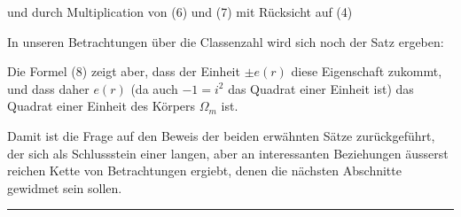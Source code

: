 und durch Multiplication von (6) und (7) mit Rücksicht auf (4)


In unseren Betrachtungen über die Classenzahl wird sich noch der Satz ergeben:


Die Formel (8) zeigt aber, dass der Einheit $\pm e(r)$ diese Eigenschaft zukommt, und dass daher $e(r)$ (da auch $-1 = i^2$ das Quadrat einer Einheit ist) das Quadrat einer Einheit des Körpers $\Omega_m$ ist.

Damit ist die Frage auf den Beweis der beiden erwähnten Sätze zurückgeführt, der sich als Schlussstein einer langen, aber an interessanten Beziehungen äusserst reichen Kette von Betrachtungen ergiebt, denen die nächsten Abschnitte gewidmet sein sollen.

\begin{center}
\rule{6em}{0.4pt}
\end{center}
